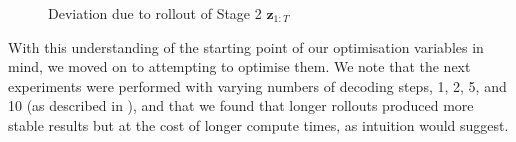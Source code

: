 \begin{figure}
    \centering
    \hfil
    \hfil
    \hfil
    \caption{Deviation due to rollout of Stage 2 $\mathbf{z}_{1:T}$}
    \label{fig:humor_stage_2_rollout_deviation}
\end{figure}

With this understanding of the starting point of our optimisation variables in mind, we moved on to attempting to optimise them. We note that the next experiments were performed with varying numbers of decoding steps, 1, 2, 5, and 10 (as described in ), and that we found that longer rollouts produced more stable results but at the cost of longer compute times, as intuition would suggest.


